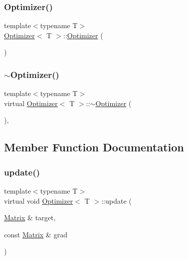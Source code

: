 \subsubsection{\texorpdfstring{Optimizer()}{Optimizer()}}
{\footnotesize\ttfamily template$<$typename T$>$ \\
\mbox{\hyperlink{class_optimizer}{Optimizer}}$<$ T $>$\+::\mbox{\hyperlink{class_optimizer}{Optimizer}} (\begin{DoxyParamCaption}{ }\end{DoxyParamCaption})\hspace{0.3cm}{\ttfamily [default]}}

\mbox{\label{class_optimizer_a1608fe90b2559c048f7d7e94ba4cf2f2}} 
\subsubsection{\texorpdfstring{$\sim$Optimizer()}{~Optimizer()}}
{\footnotesize\ttfamily template$<$typename T$>$ \\
virtual \mbox{\hyperlink{class_optimizer}{Optimizer}}$<$ T $>$\+::$\sim$\mbox{\hyperlink{class_optimizer}{Optimizer}} (\begin{DoxyParamCaption}{ }\end{DoxyParamCaption})\hspace{0.3cm}{\ttfamily [virtual]}, {\ttfamily [default]}}



\subsection{Member Function Documentation}
\mbox{\label{class_optimizer_a3f4859896cf9edab31b3875af7aad0cd}} 
\subsubsection{\texorpdfstring{update()}{update()}}
{\footnotesize\ttfamily template$<$typename T$>$ \\
virtual void \mbox{\hyperlink{class_optimizer}{Optimizer}}$<$ T $>$\+::update (\begin{DoxyParamCaption}\item[{\mbox{\hyperlink{class_optimizer_a1fa5c63152a16b8ff94df2d66e3a7a97}{Matrix}} \&}]{target,  }\item[{const \mbox{\hyperlink{class_optimizer_a1fa5c63152a16b8ff94df2d66e3a7a97}{Matrix}} \&}]{grad }\end{DoxyParamCaption})\hspace{0.3cm}{\ttfamily [pure virtual]}}



